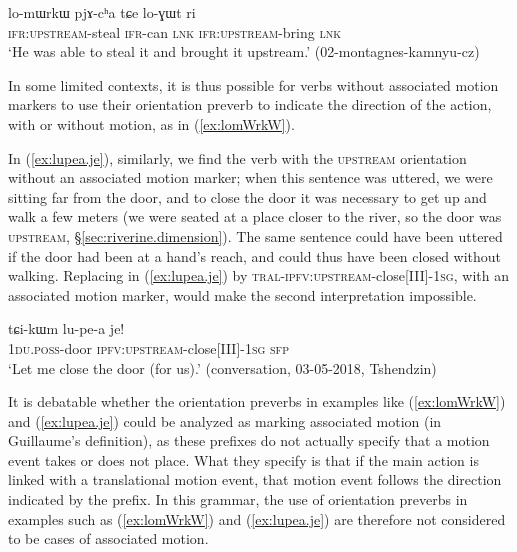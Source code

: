 \begin{exe}
\ex \label{ex:lomWrkW}
 \gll lo-mɯrkɯ pjɤ-cʰa tɕe lo-ɣɯt ri \\
 \textsc{ifr}:\textsc{upstream}-steal \textsc{ifr}-can \textsc{lnk} \textsc{ifr}:\textsc{upstream}-bring \textsc{lnk} \\
\glt `He was able to steal it and brought it upstream.' (02-montagnes-kamnyu-cz)
\end{exe}

In some limited contexts, it is thus possible for verbs without associated motion markers to use their orientation preverb to indicate the direction of the action, with or without motion, as in (\ref{ex:lomWrkW}). 

In (\ref{ex:lupea.je}), similarly, we find the verb  with the \textsc{upstream} orientation without an associated motion marker; when this sentence was uttered, we were sitting far from the door, and to close the door it was necessary to get up and walk a few meters (we were seated at a place closer to the river, so the door was \textsc{upstream}, §\ref{sec:riverine.dimension}). The same sentence could have been uttered if the door had been at a hand's reach, and could thus have been closed without walking. Replacing  in (\ref{ex:lupea.je}) by  \textsc{tral}-\textsc{ipfv}:\textsc{upstream}-close[III]-\textsc{1sg}, with an associated motion marker, would make the second interpretation impossible.

\begin{exe}
\ex \label{ex:lupea.je}
\gll tɕi-kɯm lu-pe-a je! \\
\textsc{1du}.\textsc{poss}-door \textsc{ipfv}:\textsc{upstream}-close[III]-\textsc{1sg} \textsc{sfp} \\
\glt `Let me close the door (for us).' (conversation, 03-05-2018, Tshendzin)
\end{exe}

It is debatable whether the orientation preverbs in examples like (\ref{ex:lomWrkW}) and (\ref{ex:lupea.je}) could be analyzed as marking associated motion (in Guillaume's \citeyear{guillaume16am} definition), as these prefixes do not actually specify that a motion event takes or does not place. What they specify is that if the main action is linked with a translational motion event, that motion event follows the direction indicated by the prefix. In this grammar, the use of orientation preverbs in examples such as (\ref{ex:lomWrkW}) and (\ref{ex:lupea.je}) are therefore not considered to be cases of associated motion.

